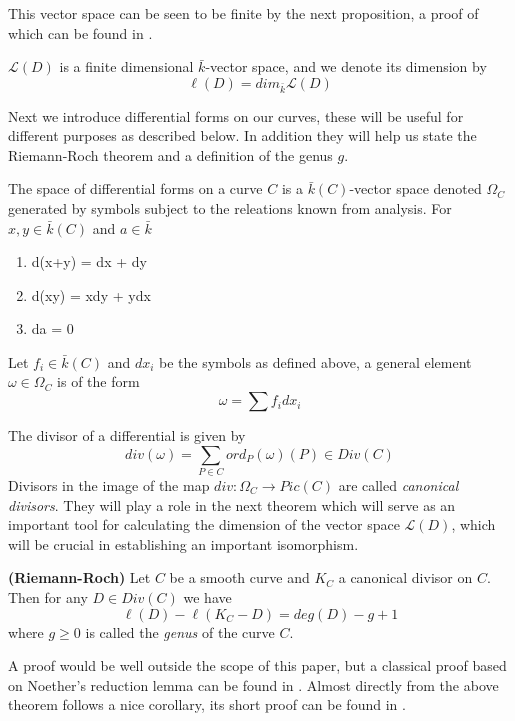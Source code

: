 This vector space can be seen to be finite by the next proposition, a proof of
which can be found in \cite{Fulton}.

\begin{prop}
 $\mathscr{L}(D)$ is a finite dimensional $\bar{k}$-vector space, and we denote
its dimension by
$$ \ell(D) = dim_{\bar{k}} \mathscr{L}(D) $$
\end{prop}

Next we introduce differential forms on our curves, these will be useful for different purposes
as described below. In addition they will help us state the Riemann-Roch theorem and a definition
of the genus $g$.

\begin{mydef}
 The space of differential forms on a curve $C$ is a $\bar{k}(C)$-vector space denoted $\Omega_C$
generated by symbols subject to the releations known from analysis. 
For $x, y \in \bar{k}(C)$ and $a \in \bar{k}$
\begin{enumerate}
  \item d(x+y) = dx + dy
  \item d(xy) = xdy + ydx
  \item da = 0
\end{enumerate}
Let $f_i \in \bar{k}(C)$ and $dx_i$ be the symbols as defined above, a general
element $\omega \in \Omega_C$ is of the form
$$ \omega = \sum f_i dx_i $$
\end{mydef}

The divisor of a differential is given by
$$ div(\omega) = \sum_{P\in C} ord_P(\omega)(P) \in Div(C)$$
Divisors in the image of the map $div: \Omega_C \rightarrow Pic(C)$ are called
\emph{canonical divisors}. They will play a role in the next theorem which will
serve as an important tool for calculating the dimension of the vector space
$\mathscr{L}(D)$, which will be crucial in establishing an important isomorphism.

\begin{thm}
 \textbf{(Riemann-Roch)}
  Let $C$ be a smooth curve and $K_C$ a canonical divisor on $C$. Then for
any $D \in Div(C)$ we have
$$ \ell(D) - \ell(K_C - D) = deg(D) - g + 1 $$
where $g \geq 0$ is called the \emph{genus} of the curve $C$.
\end{thm}

 A proof would be well outside the scope of this paper, but a classical proof based
on Noether's reduction lemma can be found in \cite{Fulton}. Almost directly from the
above theorem follows a nice corollary, its short proof can be found in \cite{AEC}.

